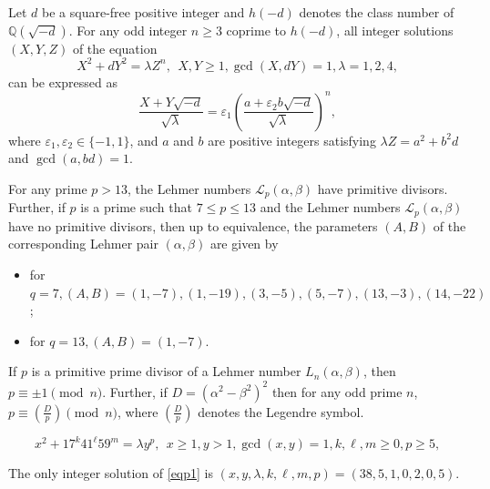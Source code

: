 \documentclass[10pt,a4paper]{amsart}
\begin{document}
\begin{lem}\label{lemYU}
Let $d$ be a square-free positive integer and $h(-d)$ denotes the class number of $\mathbb{Q}(\sqrt{-d})$. For any odd integer $n\geq 3$ coprime to $h(-d)$, all integer solutions $(X,Y,Z)$ of the equation 
\begin{equation*}\label{eqYU}
X^2+dY^2=\lambda Z^n,~~ X,Y\geq 1, \gcd(X, dY)=1, \lambda=1,2,4,
\end{equation*} 
can be expressed as 
$$\frac{X+Y\sqrt{-d}}{\sqrt{\lambda}}=\varepsilon_1\left(\frac{a+\varepsilon_2 b\sqrt{-d}}{\sqrt{\lambda}}\right)^n,$$
where $\varepsilon_1,\varepsilon_2\in\{-1, 1\}$, and $a$ and $b$ are positive integers satisfying $\lambda Z=a^2+b^2d$ and $\gcd(a, bd)=1$.
\end{lem}

\begin{lem}\label{lemBH}
For any prime $p>13$, the Lehmer numbers $\mathcal{L}_p (\alpha, \beta) $ have primitive divisors. Further, if $p$ is a prime such that $7\leq p\leq 13$ and the Lehmer numbers $\mathcal{L}_p(\alpha, \beta)$ have no primitive divisors, then up to equivalence, the parameters $(A, B)$ of the corresponding Lehmer pair $(\alpha, \beta)$ are given by  
\begin{itemize}
\item[(i)] for $q=7, (A, B)=(1,-7), (1, -19), (3, -5), (5, -7), (13, -3), (14, -22)$;  
\item[(ii)] for $q=13, (A, B)=(1,-7)$.
\end{itemize}
\end{lem}

\begin{lem}\label{lemLE}
If $p$ is a primitive prime divisor of a Lehmer number $L_n(\alpha, \beta)$, then $p\equiv \pm 1 \pmod{n}$. Further, if $D=(\alpha^2-\beta^2)^2$ then for any odd prime $n$, $p\equiv \left(\frac{D}{p}\right)\pmod n$, where $\left(\frac{D}{p}\right)$
denotes the Legendre symbol.
\end{lem}

\begin{equation}\label{eqp1}
x^2+17^k41^\ell 59^m =\lambda y^p,~~x\geq 1, y>1, \gcd(x,y)=1, k, \ell, m\geq 0, p\geq 5,
\end{equation}

\begin{prop}\label{propp}The only integer solution of \eqref{eqp1} is $(x,y,\lambda,k,\ell,m,p)=(38,5,1,0,2,0,5)$.

\end{prop}
\end{document}
